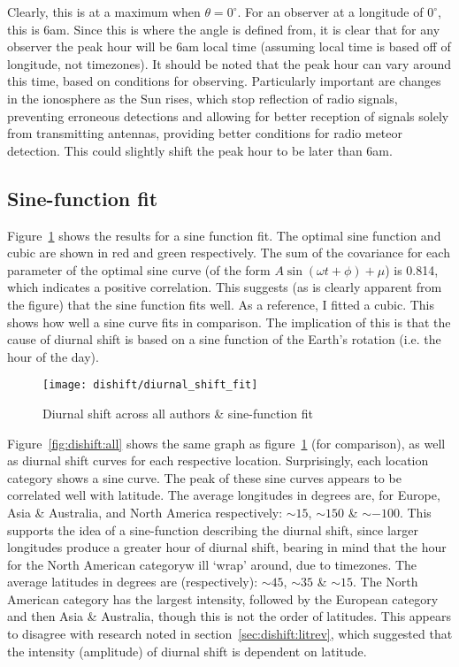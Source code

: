 Clearly, this is at a maximum when $\theta = 0^{\circ}$. For an observer at a longitude of $0^{\circ}$, this is 6am. Since this is where the angle is defined from, it is clear that for any observer the peak hour will be 6am local time (assuming local time is based off of longitude, not timezones). It should be noted that the peak hour can vary around this time, based on conditions for observing. Particularly important are changes in the ionosphere as the Sun rises, which stop reflection of radio signals, preventing erroneous detections and allowing for better reception of signals solely from transmitting antennas, providing better conditions for radio meteor detection. This could slightly shift the peak hour to be later than 6am.

\subsection{Sine-function fit}
Figure~\ref{fig:dishift:fit} shows the results for a sine function fit. The optimal sine function and cubic are shown in red and green respectively.  The sum of the covariance for each parameter of the optimal sine curve (of the form $A \sin \left( \omega t + \phi \right) + \mu$) is 0.814, which indicates a positive correlation. This suggests (as is clearly apparent from the figure) that the sine function fits well. As a reference, I fitted a cubic. This shows how well a sine curve fits in comparison. The implication of this is that the cause of diurnal shift is based on a sine function of the Earth's rotation (i.e. the hour of the day).

\begin{figure}[h!]
	\centering
	\texttt{[image: dishift/diurnal\_shift\_fit]}
	\caption{Diurnal shift across all authors \& sine-function fit
		\label{fig:dishift:fit}}
\end{figure}

Figure~\ref{fig:dishift:all} shows the same graph as figure~\ref{fig:dishift:fit} (for comparison), as well as diurnal shift curves for each respective location. Surprisingly, each location category shows a sine curve. The peak of these sine curves appears to be correlated well with latitude. The average longitudes in degrees are, for Europe, Asia \& Australia, and North America respectively: $\sim 15$, $\sim 150$ \& $\sim -100$. This supports the idea of a sine-function describing the diurnal shift, since larger longitudes produce a greater hour of diurnal shift, bearing in mind that the hour for the North American categoryw ill `wrap' around, due to timezones. The average latitudes in degrees are (respectively): $\sim 45$, $\sim 35$ \& $\sim 15$. The North American category has the largest intensity, followed by the European category and then Asia \& Australia, though this is not the order of latitudes. This appears to disagree with research noted in section~\ref{sec:dishift:litrev}, which suggested that the intensity (amplitude) of diurnal shift is dependent on latitude.  

